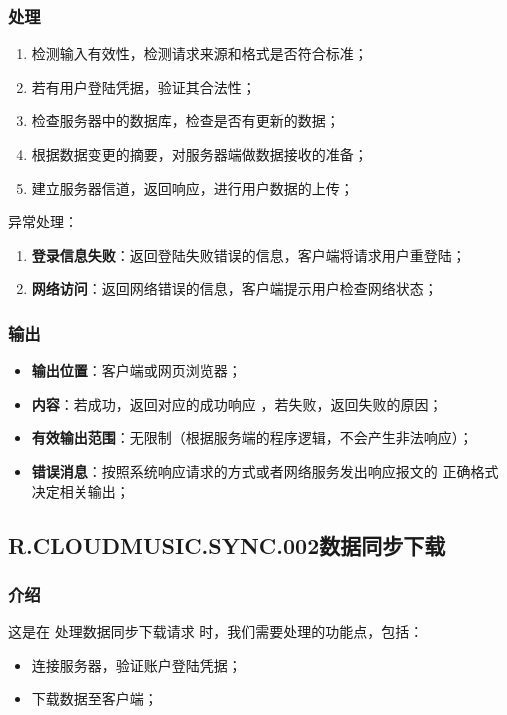 \subsubsection{处理}
	\begin{enumerate}
		\item 检测输入有效性，检测请求来源和格式是否符合标准；
		\item 若有用户登陆凭据，验证其合法性；
		\item 检查服务器中的数据库，检查是否有更新的数据；
		\item 根据数据变更的摘要，对服务器端做数据接收的准备；
		\item 建立服务器信道，返回响应，进行用户数据的上传；
	\end{enumerate}
	\noindent 异常处理：
	\begin{enumerate}
		\item \textbf{登录信息失败}：返回登陆失败错误的信息，客户端将请求用户重登陆；
		\item \textbf{网络访问}：返回网络错误的信息，客户端提示用户检查网络状态；
	\end{enumerate}
\subsubsection{输出}
\begin{itemize}
	\item \textbf{输出位置}：客户端或网页浏览器；
	\item \textbf{内容}：若成功，返回对应的成功响应 ，若失败，返回失败的原因；
	\item \textbf{有效输出范围}：无限制（根据服务端的程序逻辑，不会产生非法响应）；
	\item \textbf{错误消息}：按照系统响应请求的方式或者网络服务发出响应报文的
		正确格式决定相关输出；
\end{itemize}

\subsection{R.CLOUDMUSIC.SYNC.002数据同步下载}
\subsubsection{介绍}
	这是在 处理数据同步下载请求 时，我们需要处理的功能点，包括：
	\begin{itemize}
		\item 连接服务器，验证账户登陆凭据；
		\item 下载数据至客户端；
	\end{itemize}
